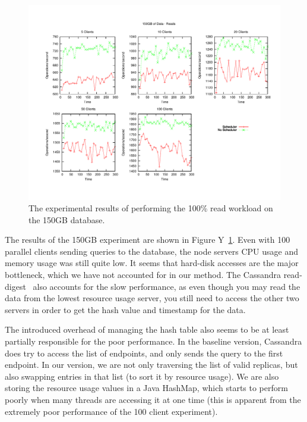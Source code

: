\documentclass[]{acm_proc_article-sp}
\begin{document}
\begin{figure}[t]
\centering
\includegraphics[scale=0.563]{images/150GB_Reads.pdf}
\vspace{-15pt}
\caption{The experimental results of performing the 100\% read workload on the 150GB database.}
\label{fig:150g_reads}
\end{figure}

The results of the 150GB experiment are shown in Figure Y~\ref{fig:150g_reads}. Even with 100 parallel clients sending queries to the database, the node servers CPU usage and memory usage was still quite low. It seems that hard-disk accesses are the major bottleneck, which we have not accounted for in our method. The Cassandra read-digest~\cite{http://wiki.apache.org/cassandra/DigestQueries} also accounts for the slow performance, as even though you may read the data from the lowest resource usage server, you still need to access the other two servers in order to get the hash value and timestamp for the data.

The introduced overhead of managing the hash table also seems to be at least partially responsible for the poor performance. In the baseline version, Cassandra does try to access the list of endpoints, and only sends the query to the first endpoint. In our version, we are not only traversing the list of valid replicas, but also swapping entries in that list (to sort it by resource usage). We are also storing the resource usage values in a Java HashMap, which starts to perform poorly when many threads are accessing it at one time (this is apparent from the extremely poor performance of the 100 client experiment).
\end{document}

